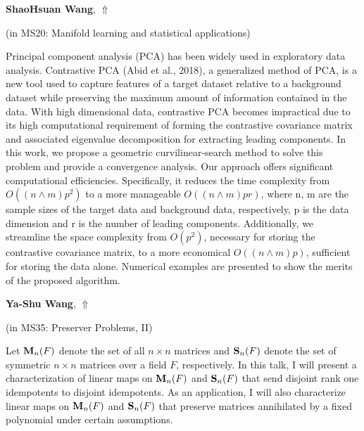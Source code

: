 \documentclass[ILAS2025-program.tex]{subfiles}
\begin{document}
\hypertarget{down0041}{}\begin{ilasabstract}
    
\textbf{ShaoHsuan Wang},  \hfill \hyperlink{up0041}{$\Uparrow$}
    
    
(in {\color{mstitle}MS20: Manifold learning and statistical applications})
        
\mtskip
    Principal component analysis (PCA) has been widely used in exploratory data analysis. 
Contrastive PCA (Abid et al., 2018), a generalized method of PCA, is a new tool used to 
capture features of a target dataset relative to a background dataset while preserving the 
maximum amount of information contained in the data. With high dimensional data, contrastive PCA becomes impractical due to its high computational requirement of forming the 
contrastive covariance matrix and associated eigenvalue decomposition for extracting leading 
components. In this work, we propose a geometric curvilinear-search method to solve this 
problem and provide a convergence analysis. Our approach offers significant computational 
efficiencies. Specifically, it reduces the time complexity from $O((n \wedge m)p^2 )$ to a more manageable $O((n \wedge m)pr)$, where n, m are the sample sizes of the target data and background
data, respectively, p is the data dimension and r is the number of leading components. Additionally, we streamline the space complexity from $O(p^2)$, necessary for storing the contrastive 
covariance matrix, to a more economical $O((n \wedge m)p)$, sufficient for storing the data alone.
Numerical  examples  are  presented  to  show  the  merits  of  the  proposed  algorithm.
\end{ilasabstract}
    

\hypertarget{down0316}{}\begin{ilasabstract}
    
\textbf{Ya-Shu Wang},  \hfill \hyperlink{up0316}{$\Uparrow$}
    
    
(in {\color{mstitle}MS35: Preserver Problems, II})
        
\mtskip
    Let ${\bf M}_n(F)$ denote the set of all $n \times n$ matrices and ${\bf S}_n(F)$ denote the set of symmetric $n \times n$ matrices over a field $F$, respectively.
In this talk, I will present a characterization of linear maps on ${\bf M}_n(F)$ and ${\bf S}_n(F)$ that send disjoint rank one idempotents to disjoint idempotents. As an application,  I will also characterize linear maps on ${\bf M}_n(F)$ and ${\bf S}_n(F)$ that preserve matrices annihilated by a fixed polynomial under certain assumptions.

\end{ilasabstract}
    
\end{document}
